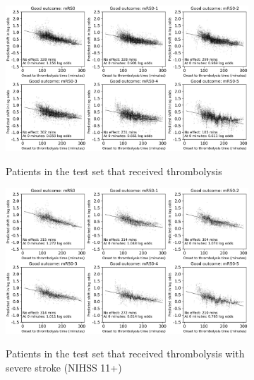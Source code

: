 \begin{figure}[!ht]
    \centering
    \begin{subfigure}[b]{.7\textwidth}
      \centering
      \includegraphics[width=1\textwidth]{./images/103_xgb_7_features_1fold_binary_improvement_logodds_bymRSthreshold_sns_6_subplots_nLVO_LVO_ivt_shap_paper}\\
      \caption{Patients in the test set that received thrombolysis}
      \label{fig:shap_shift_lvo_nlvo}
    \end{subfigure}
    \hfill
    \begin{subfigure}[b]{.7\textwidth}
      \centering    
      \includegraphics[width=1\textwidth]{./images/103_xgb_7_features_1fold_binary_improvement_logodds_bymRSthreshold_sns_6_subplots_LVO_ivt_shap_paper}\\
      \caption{Patients in the test set that received thrombolysis with severe stroke (NIHSS 11+)}
      \label{fig:shap_shift_lvo}
    \end{subfigure}
    \hfill
    \begin{subfigure}[b]{.7
    \textwidth}

\end{subfigure}
\end{figure}
